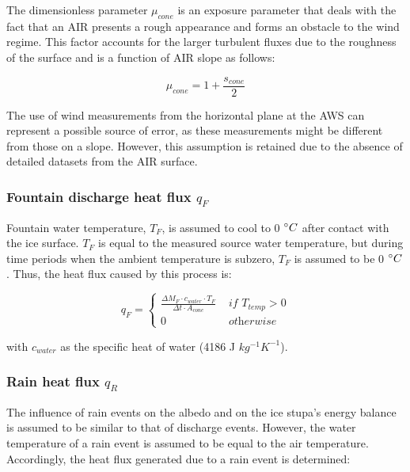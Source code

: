 The dimensionless parameter $\mu_{cone}$ is an exposure parameter that deals with the fact that an \ac{AIR} presents a rough
appearance and forms an obstacle to the wind regime. This factor accounts for the larger turbulent fluxes due to
the roughness of the surface \citep{oerlemansBriefCommunicationGrowth2021} and is a function of \ac{AIR} slope
as follows:

\begin{equation}
	\mu_{cone} = 1 + \frac{s_{cone}}{2}
	\label{eqn:mu}
\end{equation}

The use of wind measurements from the horizontal plane at the \ac{AWS} can represent a possible source of error,
as these measurements might be different from those on a slope. However, this assumption is retained due to the absence of detailed datasets from the \ac{AIR} surface.

\subsubsection{Fountain discharge heat flux \texorpdfstring{$q_{F}$}{Lg} } \label{sec:heatflux}

Fountain water temperature, $T_F$, is assumed to cool to 0 $^{\circ} C$ after contact with the ice surface.
$T_F$ is equal to the measured source water temperature, but during time periods when the ambient temperature is
subzero, $T_F$ is assumed to be 0 $^{\circ} C$. Thus, the heat flux caused by this process is:

\begin{equation}
	q_{F} = \left\{ \begin{array}{ll}
		\frac{ \Delta M_F \cdot c_{water} \cdot T_F}{\Delta t \cdot A_{cone}} & \textit{ if } T_{temp} > 0 \\
		0                                                                     & \textit{ otherwise}
	\end{array} \right.
\end{equation}

with $c_{water}$ as the specific heat of water (4186 J $kg^{-1} K^{-1}$).

\subsubsection{Rain heat flux \texorpdfstring{$q_{R}$}{Lg} }

The influence of rain events on the albedo and on the ice stupa's energy balance is assumed to be similar to that of discharge
events. However, the water temperature of a rain event is assumed to be equal to the air temperature. Accordingly,
the heat flux generated due to a rain event is determined:

